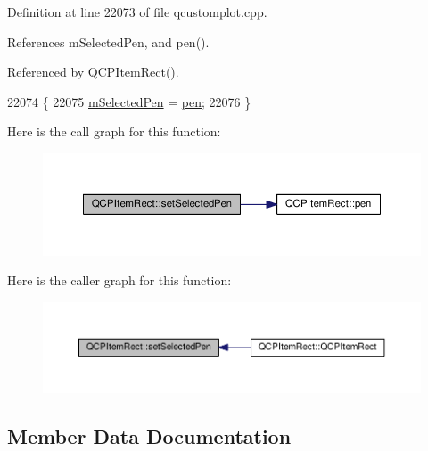 Definition at line 22073 of file qcustomplot.\+cpp.



References m\+Selected\+Pen, and pen().



Referenced by Q\+C\+P\+Item\+Rect().


\begin{DoxyCode}
22074 \{
22075   \hyperlink{class_q_c_p_item_rect_a73cc0bee61de3c67221ec8c7a76a29ed}{mSelectedPen} = \hyperlink{class_q_c_p_item_rect_a3cb7b6de5e82cc5a3c99e9de919a55e6}{pen};
22076 \}
\end{DoxyCode}


Here is the call graph for this function\+:\nopagebreak
\begin{figure}[H]
\begin{center}
\leavevmode
\includegraphics[width=350pt]{class_q_c_p_item_rect_a52a1bcb2dc753a538e406a2ba3cf21ce_cgraph}
\end{center}
\end{figure}




Here is the caller graph for this function\+:\nopagebreak
\begin{figure}[H]
\begin{center}
\leavevmode
\includegraphics[width=350pt]{class_q_c_p_item_rect_a52a1bcb2dc753a538e406a2ba3cf21ce_icgraph}
\end{center}
\end{figure}




\subsection{Member Data Documentation}
\hypertarget{class_q_c_p_item_rect_a99313bf2b338d9f81e19bd38082038aa}{}

